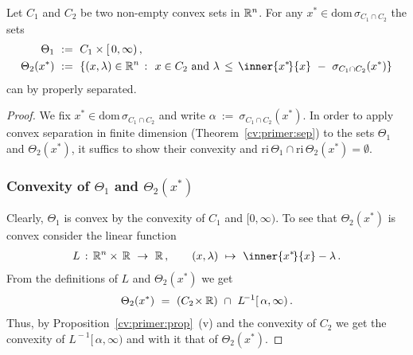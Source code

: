 \begin{lemma}
  \label{cv:primer:lem}
  Let $C_1$ and $C_2$ be two non-empty convex sets in $\mathbb{R}^n$.
  For any
  $ x^* \in \mathrm{dom}\, \sigma_{C_1\cap C_2} $
  the sets
  \begin{align*}
    \Theta_1
    &
    \ :=\ 
    C_1 \times [\,0,\infty)
    \,,
    \\
    \Theta_2
    (x^*)
    &
    \ :=\ 
    \left\{ 
      (x,\lambda)\in \R^n
      \ 
      \colon
      \ 
      x \in C_2
      \ 
      \text{and}
      \ 
      \lambda
      \,
      \le
      \,
      \inner{x^*\!}{x} 
      \ 
      -
      \ 
      \sigma_{C_1\cap C_2}(x^*)
    \right\}
  \end{align*}
  can by properly separated.
\end{lemma}
\begin{proof}
  We fix 
  $ x^* \in \mathrm{dom}\, \sigma_{C_1\cap C_2} $
  and write
  $ 
  \alpha
  \ 
  :=
  \ 
  \sigma_{C_1\cap C_2}(x^*)
  $.
  In order to apply convex separation in finite dimension 
  (Theorem~\ref{cv:primer:sep})
  to
  the sets
  $ \Theta_1 $ and $ \Theta_2(x^*) $,
  it suffics to show
  their convexity and
  $
    \mathrm{ri}\, 
    \Theta_1
    \cap
    \mathrm{ri}\, 
    \Theta_2(x^*)
    =
    \emptyset
  $.
  \subsubsection*{Convexity of 
  $ \Theta_1 $ and $ \Theta_2(x^*) $
  }
  Clearly, 
  $ \Theta_1 $ is convex by the convexity of 
  $ C_1 $ and $ [0,\infty) $.
 To see that $\Theta_2(x^*)$ is convex consider the linear function
 \begin{gather*}
    L
    \,
    :
    \,
    \R^n\times\,  \R 
    \ 
    \to
    \ 
    \R
    \,,
    \qquad 
    (x,\lambda)
    \ 
    \mapsto
    \ 
    \inner{x^*\!}{x} - \lambda
    \,.
 \end{gather*}
 From the definitions of $L$ and $\Theta_2(x^*)$ we get 
  \begin{gather*}
 \Theta_2
 (x^*)
    \ 
    =
    \ 
    (
    C_2\!\times\R
    )
    \ 
    \cap
    \ 
    L^{\!-1}
    [\,\alpha,\infty)
    \,
    .
  \end{gather*}
  Thus,
  by
  Proposition~\ref{cv:primer:prop}~(v)
  and the convexity of $C_2$ we get the convexity of
  $
    L^{\!-1}
    [\,\alpha,\infty)
  $ and with it that of $\Theta_2(x^*)$.


\end{proof}
